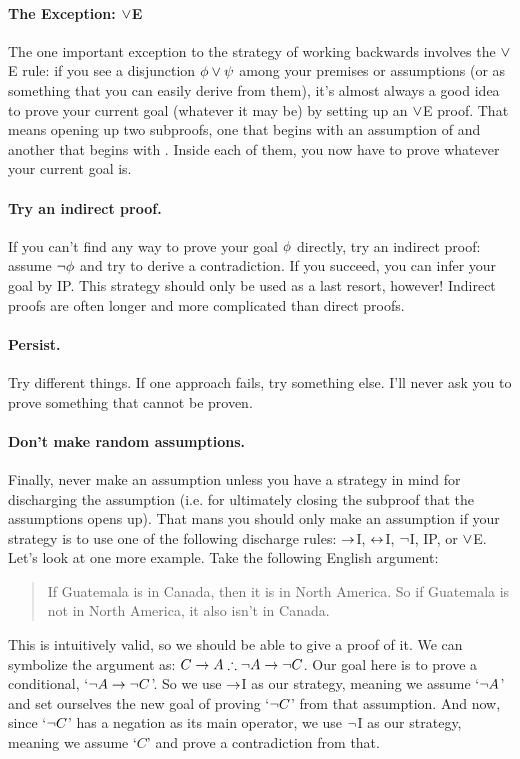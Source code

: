 \paragraph{The Exception: $\vee$E}
The one important exception to the strategy of working backwards involves the $\vee$E rule: if you see a disjunction $\mathcal{\phi} \vee \mathcal{\psi}$ among your premises or assumptions (or as something that you can easily derive from them), it's almost always a good idea to prove your current goal (whatever it may be) by setting up an $\vee$E proof.  That means opening up two subproofs, one that begins with an assumption of \meta{\phi} and another that begins with \meta{\psi}.  Inside each of them, you now have to prove whatever your current goal is.



\paragraph{Try an indirect proof.}
If you can't find any way to prove your goal $\mathcal{\phi}$ directly, try an indirect proof: assume $\neg \mathcal{\phi}$ and try to derive a contradiction.  If you succeed, you can infer your goal \meta{\phi} by IP.  This strategy should only be used as a last resort, however!  Indirect proofs are often longer and more complicated than direct proofs.

\paragraph{Persist.}
Try different things. If one approach fails, try something else.  I'll never ask you to prove something that cannot be proven.

\paragraph{Don't make random assumptions.} Finally, never make an assumption unless you have a strategy in mind for discharging the assumption (i.e. for ultimately closing the subproof that the assumptions opens up).  That mans you should only make an assumption if your strategy is to use one of the following discharge rules: $\rightarrow$I, $\leftrightarrow$I, $\neg$I, IP, or $\vee$E.\\


Let's look at one more example.  Take the following English argument:
\begin{quote}
If Guatemala is in Canada, then it is in North America. So if Guatemala is not in North America, it also isn't in Canada.
\end{quote}
This is intuitively valid, so we should be able to give a proof of it.  We can symbolize the argument as: $C \rightarrow A \therefore \neg A \rightarrow \neg C$.	Our goal here is to prove a conditional, `$\neg A \rightarrow \neg C$'.  So we use $\rightarrow$I as our strategy, meaning we assume `$\neg A$' and set ourselves the new goal of proving `$\neg C$' from that assumption.  And now, since `$\neg C$' has a negation as its main operator, we use $\neg$I as our strategy, meaning we assume `$C$' and prove a contradiction from that.

